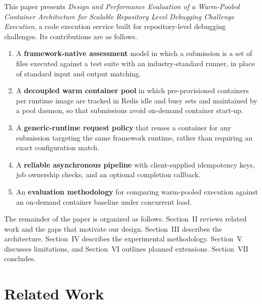 \documentclass[conference]{IEEEtran}
\begin{document}
This paper presents \emph{Design and Performance Evaluation of a Warm-Pooled Container Architecture for Scalable Repository Level Debugging Challenge Execution}, a code execution service built for repository-level debugging challenges. Its contributions are as follows.
\begin{enumerate}
\item A \textbf{framework-native assessment} model in which a submission is a set of files executed against a test suite with an industry-standard runner, in place of standard input and output matching.
\item A \textbf{decoupled warm container pool} in which pre-provisioned containers per runtime image are tracked in Redis idle and busy sets and maintained by a pool daemon, so that submissions avoid on-demand container start-up.
\item A \textbf{generic-runtime request policy} that reuses a container for any submission targeting the same framework runtime, rather than requiring an exact configuration match.
\item A \textbf{reliable asynchronous pipeline} with client-supplied idempotency keys, job ownership checks, and an optional completion callback.
\item An \textbf{evaluation methodology} for comparing warm-pooled execution against an on-demand container baseline under concurrent load.
\end{enumerate}

The remainder of the paper is organized as follows. Section~II reviews related work and the gaps that motivate our design. Section~III describes the architecture. Section~IV describes the experimental methodology. Section~V discusses limitations, and Section~VI outlines planned extensions. Section~VII concludes.

\section{Related Work}
\end{document}
